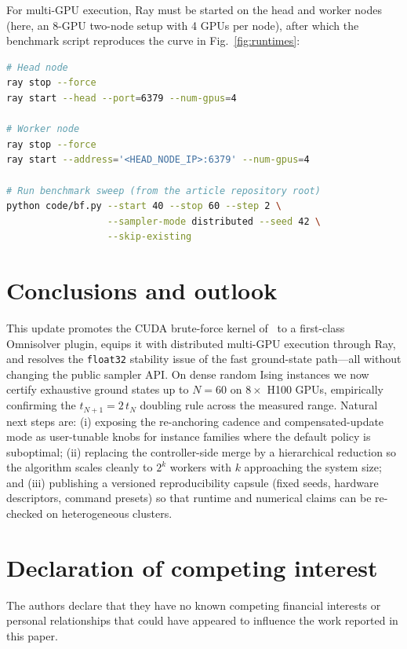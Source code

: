 \documentclass[preprint,12pt,a4paper]{elsarticle}
\begin{document}
For multi-GPU execution, Ray must be started on the head and worker
nodes (here, an 8-GPU two-node setup with 4 GPUs per node), after which the
benchmark script reproduces the curve in Fig.~\ref{fig:runtimes}:

\begin{lstlisting}[language=bash,caption={Ray startup and benchmark command used to produce Fig.~\ref{fig:runtimes}},label={lst:ray-commands}]
# Head node
ray stop --force
ray start --head --port=6379 --num-gpus=4

# Worker node
ray stop --force
ray start --address='<HEAD_NODE_IP>:6379' --num-gpus=4

# Run benchmark sweep (from the article repository root)
python code/bf.py --start 40 --stop 60 --step 2 \
                  --sampler-mode distributed --seed 42 \
                  --skip-existing
\end{lstlisting}

\section{Conclusions and outlook}
\label{sec:conclusions}
This update promotes the CUDA brute-force kernel
of~\cite{jalowiecki2021brute} to a first-class Omnisolver plugin, equips it
with distributed multi-GPU execution through Ray, and resolves the
\texttt{float32} stability issue of the fast ground-state path---all
without changing the public sampler API. On dense random Ising instances we
now certify exhaustive ground states up to $N=60$ on $8\times$ H100 GPUs,
empirically confirming the $t_{N+1}=2\,t_N$ doubling rule across the
measured range. Natural next steps are: (i) exposing the re-anchoring
cadence and compensated-update mode as user-tunable knobs for instance
families where the default policy is suboptimal; (ii) replacing the
controller-side merge by a hierarchical reduction so the algorithm scales
cleanly to $2^k$ workers with $k$ approaching the system size; and (iii)
publishing a versioned reproducibility capsule (fixed seeds, hardware
descriptors, command presets) so that runtime and numerical claims can be
re-checked on heterogeneous clusters.

\section*{Declaration of competing interest}
The authors declare that they have no known competing financial interests or
personal relationships that could have appeared to influence the work reported
in this paper.
\end{document}
